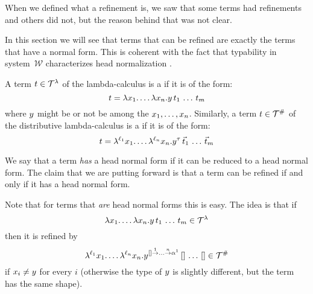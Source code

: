 When we defined what a refinement is, we saw that some terms had refinements and others
did not, but the reason behind that was not clear.

In this section we will see that terms that can be refined are exactly the terms
that have a normal form.
This is coherent with the fact that typability in system~$\mathcal{W}$ characterizes
head normalization \cite[Corollary 5.5]{bucciarelli2017non}.

\begin{definition}
A term $t \in \mathcal{T}^{\lambda}$ of the lambda-calculus is a 
if it is of the form:
\[
  t = \lambda x_1. \hdots\lambda x_n. y\,t_1\,\hdots\,t_m
\]
where $y$ might be or not be among the $x_1,\hdots,x_n$.
Similarly, a term $t \in \mathcal{T}^{\mathtt{\#}}$ of the distributive lambda-calculus is a 
if it is of the form:
\[
  t = \lambda^{\ell_1} x_1. \hdots\lambda^{\ell_n} x_n. y^{\tau}\,\vec{t}_1\,\hdots\,\vec{t}_m
\]
\end{definition}

We say that a term \emph{has} a head normal form if it can be reduced to a head normal form.
The claim that we are putting forward is that a term can be refined if and only if it has
a head normal form.

Note that for terms that \emph{are} head normal forms this is easy. The idea is that
if \[\lambda x_1. \hdots\lambda x_n. y\,t_1\,\hdots\,t_m \in \mathcal{T}^{\lambda}\]
then it is refined by
\[\lambda^{\ell_1} x_1. \hdots\lambda^{\ell_n} x_n. y^{[] \overset{1}{\to} \hdots \overset{n}{\to} \alpha^1}\,[]\,\hdots\,[] \in \mathcal{T}^{\mathtt{\#}}\]
if $x_i \neq y$ for every $i$ (otherwise the type of $y$ is slightly different,
but the term has the same shape).

